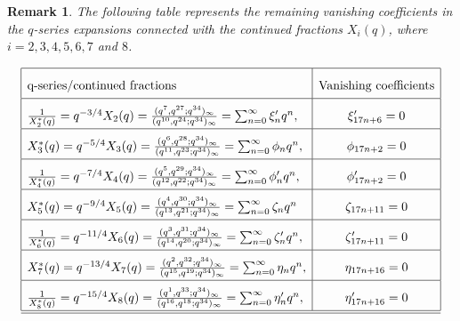\documentclass[11pt,a4paper]{article}
\numberwithin{equation}{section}
\theoremstyle{plain}
\newtheorem{remark}{Remark}[section]
\begin{document}
	\begin{remark}
		The following table represents the remaining vanishing coefficients in the $q$-series expansions connected with the continued fractions ${X_i(q)}$, where $i=2,3,4,5,6,7$ and $8$.
	\end{remark}
	\[
	\renewcommand{\arraystretch}{2}
	\begin{array}{|l|c|}
		\hline
		\text{q-series/continued fractions} & \text{Vanishing coefficients} \\ 
		\hline
    	\frac{1}{X_2^*(q)} = q^{-3/4} X_2(q)
		= \frac{(q^{7}, q^{27}; q^{34})_\infty}{(q^{10}, q^{24}; q^{34})_\infty}
		= \sum_{n=0}^{\infty} \xi'_n q^n,
		& \xi'_{17n+6} = 0 \\ 
		\hline
		
	
		X_3^*(q) = q^{-5/4} X_3(q)
		= \frac{(q^6, q^{28}; q^{34})_\infty}{(q^{11}, q^{23}; q^{34})_\infty}
		= \sum_{n=0}^{\infty} \phi_n q^n,
		& \phi_{17n+2} = 0 \\ 
		\hline
		
		\frac{1}{X_4^*(q)} = q^{-7/4} X_4(q)
		= \frac{(q^{5}, q^{29}; q^{34})_\infty}{(q^{12}, q^{22}; q^{34})_\infty}
		= \sum_{n=0}^{\infty} \phi'_n q^n,
		& \phi'_{17n+2} = 0 \\ 
		\hline
		
		X_5^*(q) = q^{-9/4} X_5(q)
		= \frac{(q^4, q^{30}; q^{34})_\infty}{(q^{13}, q^{21}; q^{34})_\infty}
		= \sum_{n=0}^{\infty} \zeta_n q^n
		& \zeta_{17n+11} = 0 \\ 
		\hline
		
		\frac{1}{X_6^*(q)} = q^{-11/4} X_6(q)
		= \frac{(q^{3}, q^{31}; q^{34})_\infty}{(q^{14}, q^{20}; q^{34})_\infty}
		= \sum_{n=0}^{\infty} \zeta'_n q^n,
		& \zeta'_{17n+11} = 0 \\ 
		\hline
		
		X_7^*(q) = q^{-13/4} X_7(q)
		= \frac{(q^2, q^{32}; q^{34})_\infty}{(q^{15}, q^{19}; q^{34})_\infty}
		= \sum_{n=0}^{\infty} \eta_n q^n,
		& \eta_{17n+16} = 0 \\ 
		\hline
		
	    \frac{1}{X_8^*(q)} = q^{-15/4} X_8(q)
     	= \frac{(q^{1}, q^{33}; q^{34})_\infty}{(q^{16}, q^{18}; q^{34})_\infty}
    	= \sum_{n=0}^{\infty} \eta'_n q^n,
		& \eta'_{17n+16} = 0 \\ 
		\hline
        \hline
		
	\end{array}
	\]
	
\end{document}
